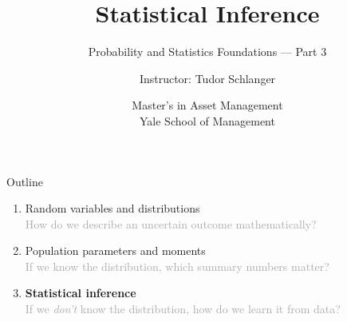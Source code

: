 \documentclass[9pt,english,aspectratio=169]{beamer}
\title{\textbf{Statistical Inference}}
\subtitle{Probability and Statistics Foundations --- Part 3}
\author{Instructor: Tudor Schlanger}
\date{Master's in Asset Management \\ Yale School of Management}
\begin{document}
\begin{frame}
  \titlepage
\end{frame}

\begin{frame}{Outline}

  \vspace{0.8em}
  \large
  \begin{enumerate}
    \item[\textbf{1.}] Random variables and distributions \\
          {\small\textcolor{DarkGray}{How do we describe an uncertain outcome mathematically?}}
          \vspace{0.5em}
    \item[\textbf{2.}] Population parameters and moments \\
          {\small\textcolor{DarkGray}{If we know the distribution, which summary numbers matter?}}
          \vspace{0.5em}
    \item[\textbf{3.}] \textbf{Statistical inference} \\
          {\small\textcolor{DarkGray}{If we \emph{don't} know the distribution, how do we learn it from data?}}
  \end{enumerate}

\end{frame}




\end{document}

